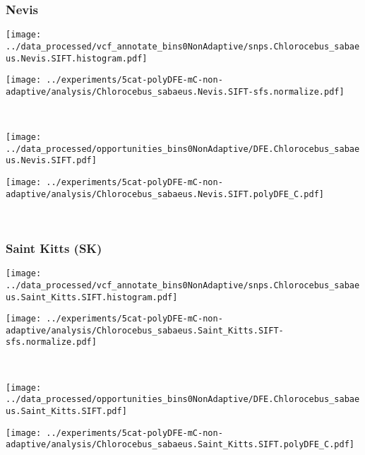 \subsubsection{Nevis}

\begin{minipage}{0.49\linewidth}
    \texttt{[image: ../data\_processed/vcf\_annotate\_bins0NonAdaptive/snps.Chlorocebus\_sabaeus.Nevis.SIFT.histogram.pdf]}
\end{minipage}
\begin{minipage}{0.49\linewidth}
    \texttt{[image: ../experiments/5cat-polyDFE-mC-non-adaptive/analysis/Chlorocebus\_sabaeus.Nevis.SIFT-sfs.normalize.pdf]}
\end{minipage}
\\
\begin{minipage}{0.49\linewidth}
    \texttt{[image: ../data\_processed/opportunities\_bins0NonAdaptive/DFE.Chlorocebus\_sabaeus.Nevis.SIFT.pdf]}
\end{minipage}
\begin{minipage}{0.49\linewidth}
    \texttt{[image: ../experiments/5cat-polyDFE-mC-non-adaptive/analysis/Chlorocebus\_sabaeus.Nevis.SIFT.polyDFE\_C.pdf]}
\end{minipage}
\\

\subsubsection{Saint Kitts (SK)}

\begin{minipage}{0.49\linewidth}
    \texttt{[image: ../data\_processed/vcf\_annotate\_bins0NonAdaptive/snps.Chlorocebus\_sabaeus.Saint\_Kitts.SIFT.histogram.pdf]}
\end{minipage}
\begin{minipage}{0.49\linewidth}
    \texttt{[image: ../experiments/5cat-polyDFE-mC-non-adaptive/analysis/Chlorocebus\_sabaeus.Saint\_Kitts.SIFT-sfs.normalize.pdf]}
\end{minipage}
\\
\begin{minipage}{0.49\linewidth}
    \texttt{[image: ../data\_processed/opportunities\_bins0NonAdaptive/DFE.Chlorocebus\_sabaeus.Saint\_Kitts.SIFT.pdf]}
\end{minipage}
\begin{minipage}{0.49\linewidth}
    \texttt{[image: ../experiments/5cat-polyDFE-mC-non-adaptive/analysis/Chlorocebus\_sabaeus.Saint\_Kitts.SIFT.polyDFE\_C.pdf]}
\end{minipage}
\\

